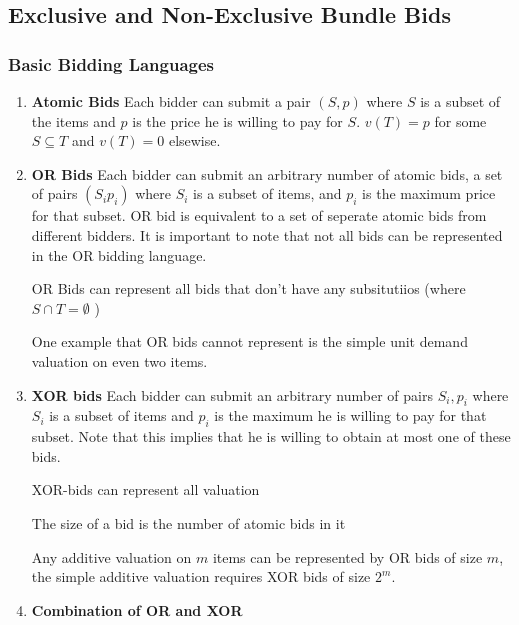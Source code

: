\documentclass{article}
\begin{document}
\subsection{Exclusive and Non-Exclusive Bundle Bids} 

\subsubsection{Basic Bidding Languages}

\begin{enumerate}
    \item \textbf{Atomic Bids}
    Each bidder can submit a pair \((S,p)\) where \(S\) is a subset of the items and \(p\) is the price he is willing to pay for \(S\). \(v(T) = p \) for some \(S \subseteq T\) and \(v(T) = 0\) elsewise.  
    \item \textbf{OR Bids}
    Each bidder can submit an arbitrary number of atomic bids, a set of pairs \((S_i p_i)\) where \(S_i\) is a subset of items, and \(p_i\) is the maximum price for that subset. OR bid is equivalent to a set of seperate atomic bids from different bidders. It is important to note that not all bids can be represented in the OR bidding language. 
    
    \begin{definition}
	OR Bids can represent all bids that don't have any subsitutiios (where \(S \cap T = \emptyset\) )
    \end{definition} 

    One example that OR bids cannot represent is the simple unit demand valuation on even two items. 

    \item \textbf{XOR bids} Each bidder can submit an arbitrary number of pairs \(S_i, p_i\) where \(S_i\) is a subset of items and \(p_i\) is the maximum he is willing to pay for that subset. Note that this implies that he is willing to obtain at most one of these bids. 
    
    \begin{definition}
	XOR-bids can represent all valuation
\end{definition}

    \begin{definition}
	The size of a bid is the number of atomic bids in it 
\end{definition}

Any additive valuation on \(m\) items can be represented by OR bids of size \(m\), the simple additive valuation requires XOR bids of size \(2^m\).   
    \item \textbf{Combination of OR and XOR}


\end{enumerate}
\end{document}
